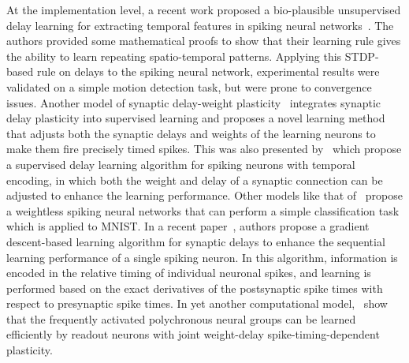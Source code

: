 \documentclass[brainsci, %
               review,submit,pdftex,moreauthors
               ]{Definitions/mdpi}
\begin{document}
At the implementation level, a recent work proposed a bio-plausible unsupervised delay learning for extracting temporal features in spiking neural networks~\citep{nadafian_bio-plausible_2020}. The authors provided some mathematical proofs to show that their learning rule gives the ability to learn repeating spatio-temporal patterns. Applying this STDP-based rule on delays to the spiking neural network, experimental results were validated on a simple motion detection task, but were prone to convergence issues. Another model of synaptic delay-weight plasticity~\citep{zhang_supervised_2020} integrates synaptic delay plasticity into supervised learning and proposes a novel learning method that adjusts both the synaptic delays and weights of the learning neurons to make them fire precisely timed spikes. This was also presented by~\citep{wang_delay_2019} which propose a supervised delay learning algorithm for spiking neurons with temporal encoding, in which both the weight and delay of a synaptic connection can be adjusted to enhance the learning performance. Other models like that of~\citep{hazan_memory_2022} propose a weightless spiking neural networks that can perform a simple classification task which is applied to MNIST. In a recent paper~\citep{luo_supervised_2022}, authors propose a gradient descent-based learning algorithm for synaptic delays to enhance the sequential learning performance of a single spiking neuron. In this algorithm, information is encoded in the relative timing of individual neuronal spikes, and learning is performed based on the exact derivatives of the postsynaptic spike times with respect to presynaptic spike times.
In yet another computational model,~\citet{sun_learning_2016} show that the frequently activated polychronous neural groups can be learned efficiently by readout neurons with joint weight-delay spike-timing-dependent plasticity.

\end{document}
